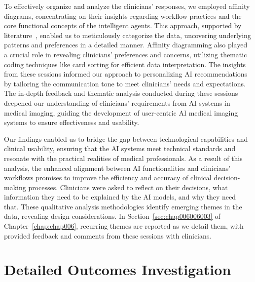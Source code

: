 \textcolor{revised}{To effectively organize and analyze the clinicians' responses, we employed affinity diagrams, concentrating on their insights regarding workflow practices and the core functional concepts of the intelligent agents.
This approach, supported by literature~\cite{DEUTSCH2019122, 10.1145/3491101.3519863}, enabled us to meticulously categorize the data, uncovering underlying patterns and preferences in a detailed manner.
Affinity diagramming also played a crucial role in revealing clinicians' preferences and concerns, utilizing thematic coding techniques like card sorting for efficient data interpretation.
The insights from these sessions informed our approach to personalizing \ac{AI} recommendations by tailoring the communication tone to meet clinicians' needs and expectations.
The in-depth feedback and thematic analysis conducted during these sessions deepened our understanding of clinicians' requirements from \ac{AI} systems in medical imaging, guiding the development of user-centric \ac{AI} medical imaging systems to ensure effectiveness and usability.}

\textcolor{revised}{Our findings enabled us to bridge the gap between technological capabilities and clinical usability, ensuring that the \ac{AI} systems meet technical standards and resonate with the practical realities of medical professionals.
As a result of this analysis, the enhanced alignment between \ac{AI} functionalities and clinicians' workflows promises to improve the efficiency and accuracy of clinical decision-making processes.}
Clinicians were asked to reflect on their decisions, what information they need to be explained by the \ac{AI} models, and why they need that.
\textcolor{revised}{These qualitative analysis methodologies identify emerging themes in the data, revealing design considerations.}
In Section~\ref{sec:chap006006003} of Chapter~\ref{chap:chap006}, recurring themes are reported as we detail them, with provided feedback and comments from these sessions with clinicians.

\section{Detailed Outcomes Investigation}
\label{sec:app005007}

